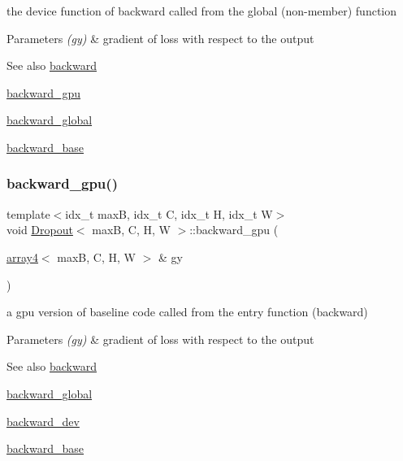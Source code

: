 the device function of backward called from the global (non-\/member) function 


\begin{DoxyParams}{Parameters}
{\em (gy)} & gradient of loss with respect to the output \\
\hline
\end{DoxyParams}
\begin{DoxySeeAlso}{See also}
\hyperlink{structDropout_afe1afe7ce80e59d1b48c820a724aae1b}{backward} 

\hyperlink{structDropout_a138fbe07114851e478ac794629b6f44a}{backward\+\_\+gpu} 

\hyperlink{softmaxcrossentropy_8h_a47d56a9a23e08247b227f4aac17413e0}{backward\+\_\+global} 

\hyperlink{structDropout_a8ea26e89ddc6b5e4546f5a6ed019ad9a}{backward\+\_\+base} 
\end{DoxySeeAlso}
\mbox{\label{structDropout_a138fbe07114851e478ac794629b6f44a}} 
\subsubsection{\texorpdfstring{backward\+\_\+gpu()}{backward\_gpu()}}
{\footnotesize\ttfamily template$<$idx\+\_\+t maxB, idx\+\_\+t C, idx\+\_\+t H, idx\+\_\+t W$>$ \\
void \hyperlink{structDropout}{Dropout}$<$ maxB, C, H, W $>$\+::backward\+\_\+gpu (\begin{DoxyParamCaption}\item[{\hyperlink{structarray4}{array4}$<$ maxB, C, H, W $>$ \&}]{gy }\end{DoxyParamCaption})\hspace{0.3cm}{\ttfamily [inline]}}



a gpu version of baseline code called from the entry function (backward) 


\begin{DoxyParams}{Parameters}
{\em (gy)} & gradient of loss with respect to the output \\
\hline
\end{DoxyParams}
\begin{DoxySeeAlso}{See also}
\hyperlink{structDropout_afe1afe7ce80e59d1b48c820a724aae1b}{backward} 

\hyperlink{softmaxcrossentropy_8h_a47d56a9a23e08247b227f4aac17413e0}{backward\+\_\+global} 

\hyperlink{structDropout_a5bbc54ad4125bf6768b5eeb17802a468}{backward\+\_\+dev} 

\hyperlink{structDropout_a8ea26e89ddc6b5e4546f5a6ed019ad9a}{backward\+\_\+base} 
\end{DoxySeeAlso}
\mbox{\label{structDropout_a364b0df75c98d5b73fd11a77bf11bf89}} 
